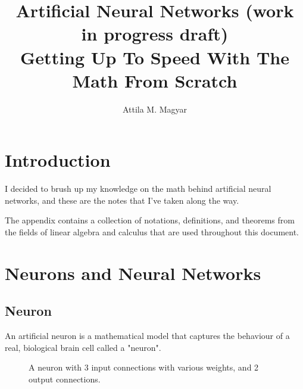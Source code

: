 \documentclass[titlepage]{article}
\title{%
  Artificial Neural Networks (work in progress draft) \\
  \large Getting Up To Speed With The Math From Scratch
}
\author{Attila M. Magyar}
\begin{document}
\begin{titlepage}\maketitle\end{titlepage}

  \tableofcontents

\newpage

  \section{Introduction}

    I decided to brush up my knowledge on the math behind artificial neural
    networks, and these are the notes that I've taken along the way.

    The appendix contains a collection of notations, definitions, and theorems
    from the fields of linear algebra and calculus that are used throughout
    this document.

\newpage

  \section{Neurons and Neural Networks}

    \subsection{Neuron}

      An artificial neuron is a mathematical model that captures the behaviour
      of a real, biological brain cell called a "neuron".

      \begin{figure}[!htb]
        \centering
        \caption{%
          A neuron with 3 input connections with various weights,
          and 2 output connections.
        }
      \end{figure}
\end{document}
